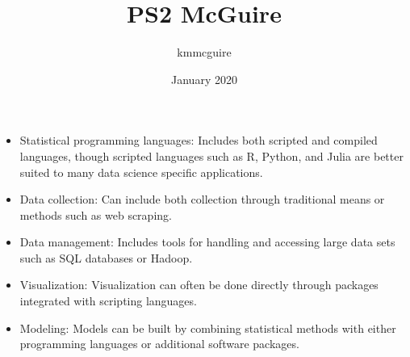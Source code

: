 \documentclass{article}
\title{PS2 McGuire}
\author{kmmcguire }
\date{January 2020}
\begin{document}
\maketitle

\begin{itemize}
    \item Statistical programming languages: Includes both scripted and compiled languages, though scripted languages such as R, Python, and Julia are better suited to many data science specific applications.
    \item Data collection: Can include both collection through traditional means or methods such as web scraping.
    \item Data management: Includes tools for handling and accessing large data sets such as SQL databases or Hadoop.
    \item Visualization: Visualization can often be done directly through packages integrated with scripting languages.
    \item Modeling: Models can be built by combining statistical methods with either programming languages or additional software packages.
\end{itemize}
\end{document}
